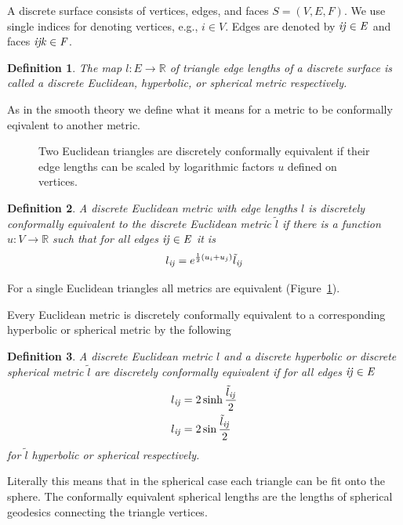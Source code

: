 \documentclass{book}
\newtheorem{definition}{Definition}
\newcommand{\R}{\mathbb R}
\begin{document}
A discrete surface consists of vertices, edges, and faces $S=(V, E, F)$. We use single indices for denoting vertices, e.g., $i \in V$. Edges are denoted by $\it{ij}\in E$ and faces $\it{ijk}\in F$.

\begin{definition}
The map $l:E\to \R$ of triangle edge lengths of a discrete surface is called a \emph{discrete Euclidean, hyperbolic, or spherical metric} respectively.
\end{definition}

As in the smooth theory we define what it means for a metric to be conformally eqivalent to another metric. 

\begin{figure}
\centering
\scalebox{0.5}{}
\caption{Two Euclidean triangles are discretely conformally equivalent if their edge lengths can be scaled by logarithmic factors $u$ defined on vertices.}
\label{fig:conformal_equivalence}
\end{figure}

\begin{definition}
A discrete Euclidean metric with edge lengths $l$ is \emph{discretely conformally equivalent} to the discrete Euclidean metric $\tilde l$ if there is a function $u:V\to \R$ such that for all edges $\it{ij}\in E$ it is
\[l_{\it{ij}} = e^{\frac{1}{2}(u_i + u_j)}\tilde l_{\it{ij}}\]
\end{definition}

For a single Euclidean triangles all metrics are equivalent (Figure~\ref{fig:conformal_equivalence}).

Every Euclidean metric is discretely conformally equivalent to a corresponding hyperbolic or spherical metric by the following 

\begin{definition}
A discrete Euclidean metric $l$ and a discrete hyperbolic or discrete spherical metric $\tilde l$ are \emph{discretely conformally equivalent} if for all edges $\it{ij}\in E$
\begin{align*}
l_{\it{ij}} &= 2\sinh \frac{\tilde l_{\it{ij}}}{2}\\
l_{\it{ij}} &= 2\sin \frac{\tilde l_{\it{ij}}}{2}
\end{align*}
for $\tilde l$ hyperbolic or spherical respectively.
\end{definition}

Literally this means that in the spherical case each triangle can be fit onto the sphere. The conformally equivalent spherical lengths are the lengths of spherical geodesics connecting the triangle vertices. 
\end{document}
